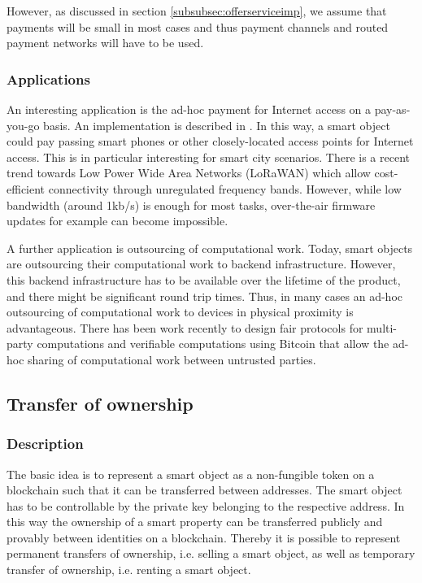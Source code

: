 \documentclass[10pt, conference,compsoc]{IEEEtran}
\begin{document}
However, as discussed in section \ref{subsubsec:offerserviceimp}, we assume that payments will be small in most cases and thus payment channels and routed payment networks will have to be used. 

\subsubsection{Applications}

An interesting application is the ad-hoc payment for Internet access on a pay-as-you-go basis. An implementation is described in \cite{siby2013paying}. In this way, a smart object could pay passing smart phones or other closely-located access points for Internet access.  This is in particular interesting for smart city scenarios. There is a recent trend towards Low Power Wide Area Networks (LoRaWAN) which allow cost-efficient connectivity through unregulated frequency bands. However, while low bandwidth (around 1kb/s) is enough for most tasks, over-the-air firmware updates for example can become impossible. 

A further application is outsourcing of computational work. Today, smart objects are outsourcing their computational work to backend infrastructure. However, this backend infrastructure has to be available over the lifetime of the product, and there might be significant round trip times. Thus, in many cases an ad-hoc outsourcing of computational work to devices in physical proximity is advantageous. 
There has been work recently to design fair protocols for multi-party computations \cite{andrychowicz2014secure,bentov2014use,andrychowicz2014fair} and verifiable computations \cite{kumaresan2014use} using Bitcoin that allow the ad-hoc sharing of computational work between untrusted parties. 


\subsection{Transfer of ownership}
\label{subsec:tow}

\subsubsection{Description}

The basic idea is to represent a smart object as a non-fungible token on a blockchain such that it can be transferred between addresses. The smart object has to be controllable by the private key belonging to the respective address. In this way the ownership of a smart property can be transferred publicly and provably between identities on a blockchain. Thereby it is possible to represent permanent transfers of ownership, i.e. selling a smart object, as well as temporary transfer of ownership, i.e. renting a smart object. 
\end{document}
